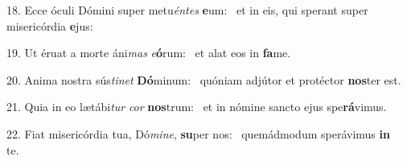 18. Ecce óculi Dómini super metu\textit{én}\textit{tes} \textbf{e}um: \ast\  et in eis, qui sperant super misericórdia \textbf{e}jus:\

19. Ut éruat a morte áni\textit{mas} \textit{e}\textbf{ó}rum: \ast\  et alat eos in \textbf{fa}me.\

20. Anima nostra sús\textit{ti}\textit{net} \textbf{Dó}minum: \ast\  quóniam adjútor et protéctor \textbf{nos}ter est.\

21. Quia in eo lætábi\textit{tur} \textit{cor} \textbf{nos}trum: \ast\  et in nómine sancto ejus spe\textbf{rá}vimus.\

22. Fiat misericórdia tua, Dó\textit{mi}\textit{ne}, \textbf{su}per nos: \ast\  quemádmodum sperávimus \textbf{in} te.\

